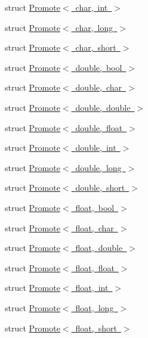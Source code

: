 \begin{DoxyCompactItemize}
\item 
struct \mbox{\hyperlink{structENSEM_1_1Promote_3_01char_00_01int_01_4}{Promote$<$ char, int $>$}}
\item 
struct \mbox{\hyperlink{structENSEM_1_1Promote_3_01char_00_01long_01_4}{Promote$<$ char, long $>$}}
\item 
struct \mbox{\hyperlink{structENSEM_1_1Promote_3_01char_00_01short_01_4}{Promote$<$ char, short $>$}}
\item 
struct \mbox{\hyperlink{structENSEM_1_1Promote_3_01double_00_01bool_01_4}{Promote$<$ double, bool $>$}}
\item 
struct \mbox{\hyperlink{structENSEM_1_1Promote_3_01double_00_01char_01_4}{Promote$<$ double, char $>$}}
\item 
struct \mbox{\hyperlink{structENSEM_1_1Promote_3_01double_00_01double_01_4}{Promote$<$ double, double $>$}}
\item 
struct \mbox{\hyperlink{structENSEM_1_1Promote_3_01double_00_01float_01_4}{Promote$<$ double, float $>$}}
\item 
struct \mbox{\hyperlink{structENSEM_1_1Promote_3_01double_00_01int_01_4}{Promote$<$ double, int $>$}}
\item 
struct \mbox{\hyperlink{structENSEM_1_1Promote_3_01double_00_01long_01_4}{Promote$<$ double, long $>$}}
\item 
struct \mbox{\hyperlink{structENSEM_1_1Promote_3_01double_00_01short_01_4}{Promote$<$ double, short $>$}}
\item 
struct \mbox{\hyperlink{structENSEM_1_1Promote_3_01float_00_01bool_01_4}{Promote$<$ float, bool $>$}}
\item 
struct \mbox{\hyperlink{structENSEM_1_1Promote_3_01float_00_01char_01_4}{Promote$<$ float, char $>$}}
\item 
struct \mbox{\hyperlink{structENSEM_1_1Promote_3_01float_00_01double_01_4}{Promote$<$ float, double $>$}}
\item 
struct \mbox{\hyperlink{structENSEM_1_1Promote_3_01float_00_01float_01_4}{Promote$<$ float, float $>$}}
\item 
struct \mbox{\hyperlink{structENSEM_1_1Promote_3_01float_00_01int_01_4}{Promote$<$ float, int $>$}}
\item 
struct \mbox{\hyperlink{structENSEM_1_1Promote_3_01float_00_01long_01_4}{Promote$<$ float, long $>$}}
\item 
struct \mbox{\hyperlink{structENSEM_1_1Promote_3_01float_00_01short_01_4}{Promote$<$ float, short $>$}}
\item 

\end{DoxyCompactItemize}
